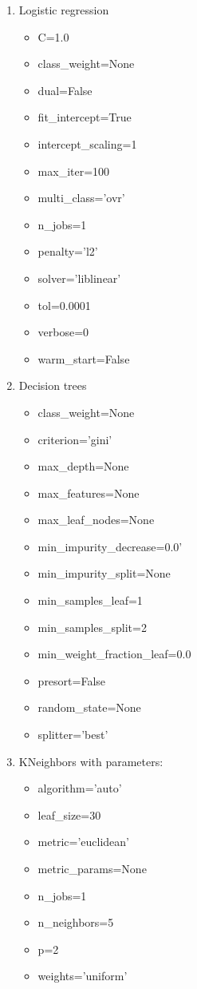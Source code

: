 \documentclass{article} %
\begin{document}
  \begin{enumerate}   
    \item Logistic regression
    \begin{itemize}
    	\item C=1.0
    	\item class\_weight=None 
    	\item dual=False
    	\item fit\_intercept=True 
    	\item intercept\_scaling=1
    	\item max\_iter=100 
    	\item multi\_class='ovr'
    	\item n\_jobs=1 
    	\item penalty='l2'
    	\item solver='liblinear'
    	\item tol=0.0001
    	\item verbose=0
    	\item warm\_start=False 
    \end{itemize}
    \item Decision trees
    \begin{itemize}
    	\item class\_weight=None 
    	\item criterion='gini'
    	\item max\_depth=None 
    	\item max\_features=None
    	\item max\_leaf\_nodes=None
    	\item min\_impurity\_decrease=0.0'
    	\item min\_impurity\_split=None 
    	\item min\_samples\_leaf=1
    	\item min\_samples\_split=2
    	\item min\_weight\_fraction\_leaf=0.0
    	\item presort=False
    	\item random\_state=None
    	\item splitter='best'
    \end{itemize}
  	\item KNeighbors with parameters:
      \begin{itemize}
      	\item algorithm='auto' 
      	\item leaf\_size=30
      	\item metric='euclidean'
      	\item metric\_params=None
      	\item n\_jobs=1
      	\item n\_neighbors=5
      	\item p=2
      	\item weights='uniform'
      \end{itemize}
   \end{enumerate}
\end{document}
